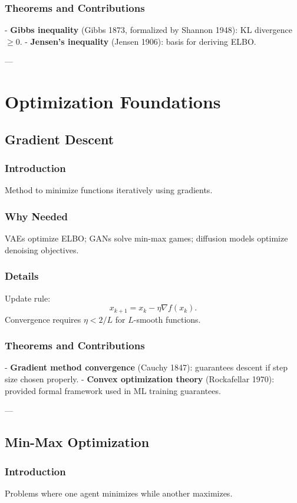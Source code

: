 \documentclass[11pt]{book}
\begin{document}
\subsection{Theorems and Contributions}
- \textbf{Gibbs inequality} (Gibbs 1873, formalized by Shannon 1948): KL divergence $\geq 0$.  
- \textbf{Jensen’s inequality} (Jensen 1906): basis for deriving ELBO.  

---

\chapter{Optimization Foundations}

\section{Gradient Descent}
\subsection{Introduction}
Method to minimize functions iteratively using gradients.

\subsection{Why Needed}
VAEs optimize ELBO; GANs solve min-max games; diffusion models optimize denoising objectives.

\subsection{Details}
Update rule:
\[
x_{k+1} = x_k - \eta \nabla f(x_k).
\]
Convergence requires $\eta < 2/L$ for $L$-smooth functions.

\subsection{Theorems and Contributions}
- \textbf{Gradient method convergence} (Cauchy 1847): guarantees descent if step size chosen properly.  
- \textbf{Convex optimization theory} (Rockafellar 1970): provided formal framework used in ML training guarantees.

---

\section{Min-Max Optimization}
\subsection{Introduction}
Problems where one agent minimizes while another maximizes.
\end{document}
